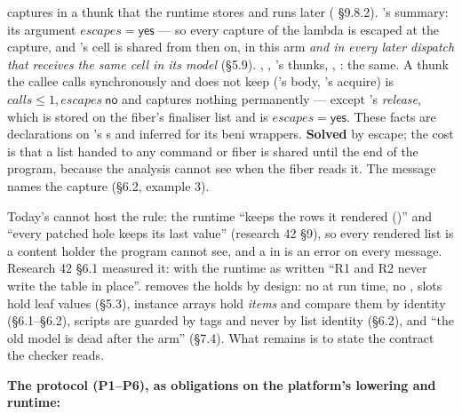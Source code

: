  captures  in a thunk that the runtime stores and runs later ( §9.8.2). 's summary: its argument $\mathit{escapes}=\mathsf{yes}$ — so every capture of the lambda is escaped at the capture, and 's cell is shared from then on, in this arm \emph{and in every later dispatch that receives the same cell in its model} (§5.9). , , 's thunks, , : the same. A thunk the callee calls synchronously and does not keep ('s body, 's acquire) is $\mathit{calls}\le 1,\allowbreak{}\mathit{escapes}\ \mathsf{no}$ and captures nothing permanently — except 's \emph{release}, which is stored on the fiber's finaliser list and is $\mathit{escapes}=\mathsf{yes}$. These facts are declarations on 's s and inferred for its beni wrappers. \textbf{Solved} by escape; the cost is that a list handed to any command or fiber is shared until the end of the program, because the analysis cannot see when the fiber reads it. The message names the capture (§6.2, example 3).


Today's  cannot host the rule: the runtime “keeps the rows it rendered ()” and “every patched hole keeps its last value” (research 42 §9), so every rendered list is a content holder the program cannot see, and a  in  is an error on every message. Research 42 §6.1 measured it: with the runtime as written “R1 and R2 never write the table in place”.  removes the holds by design: no  at run time, no , slots hold leaf values (§5.3), instance arrays hold \emph{items} and compare them by identity (§6.1–§6.2), scripts are guarded by tags and never by list identity (§6.2), and “the old model is dead after the arm” (§7.4). What remains is to state the contract the checker reads.

\textbf{The protocol (P1–P6), as obligations on the platform's lowering and runtime:}

